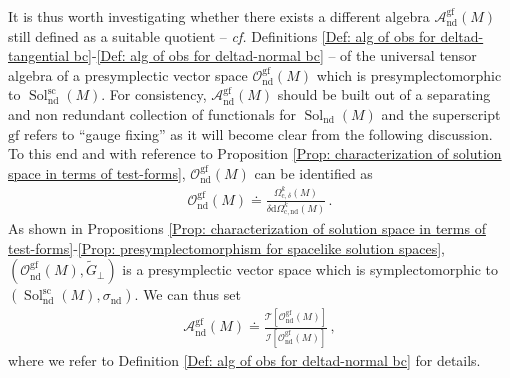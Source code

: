 It is thus worth investigating whether there exists a different algebra $\mathcal{A}^{\mathrm{gf}}_{\mathrm{nd}}(M)$ still defined as a suitable quotient -- \textit{cf.} Definitions \ref{Def: alg of obs for deltad-tangential bc}-\ref{Def: alg of obs for deltad-normal bc} -- of the universal tensor algebra of a presymplectic vector space $\mathcal{O}_{\mathrm{nd}}^{\mathrm{gf}}(M)$ which is presymplectomorphic to $\operatorname{Sol}_{\mathrm{nd}}^{\mathrm{sc}}(M)$.
For consistency, $\mathcal{A}_{\mathrm{nd}}^{\mathrm{gf}}(M)$ should be built out of a separating and non redundant collection of functionals for $\operatorname{Sol}_{\mathrm{nd}}(M)$ and the superscript $\mathrm{gf}$ refers to ``gauge fixing'' as it will become clear from the following discussion. To this end and with reference to Proposition \ref{Prop: characterization of solution space in terms of test-forms},  $\mathcal{O}_{\mathrm{nd}}^{\mathrm{gf}}(M)$ can be identified as
\begin{align*}
\mathcal{O}_{\mathrm{nd}}^{\mathrm{gf}}(M)\doteq
\frac{\Omega_{\mathrm{c},\delta}^k(M)}{\delta\mathrm{d}\Omega_{\mathrm{c,nd}}^k(M)}\,.
\end{align*}
As shown in Propositions \ref{Prop: characterization of solution space in terms of test-forms}-\ref{Prop: presymplectomorphism for spacelike solution spaces}, $(\mathcal{O}_{\mathrm{nd}}^{\mathrm{gf}}(M),\widetilde{G}_\perp)$ is a presymplectic vector space which is symplectomorphic to $(\operatorname{Sol}_{\mathrm{nd}}^{\mathrm{sc}}(M),\sigma_{\mathrm{nd}})$.
We can thus set
\begin{align*}
\mathcal{A}_{\mathrm{nd}}^{\mathrm{gf}}(M)\doteq
\frac{\mathcal{T}[\mathcal{O}_{\mathrm{nd}}^{\mathrm{gf}}(M)]}{\mathcal{I}[\mathcal{O}_{\mathrm{nd}}^{\mathrm{gf}}(M)]}\,,
\end{align*}
where we refer to Definition \ref{Def: alg of obs for deltad-normal bc} for details.

